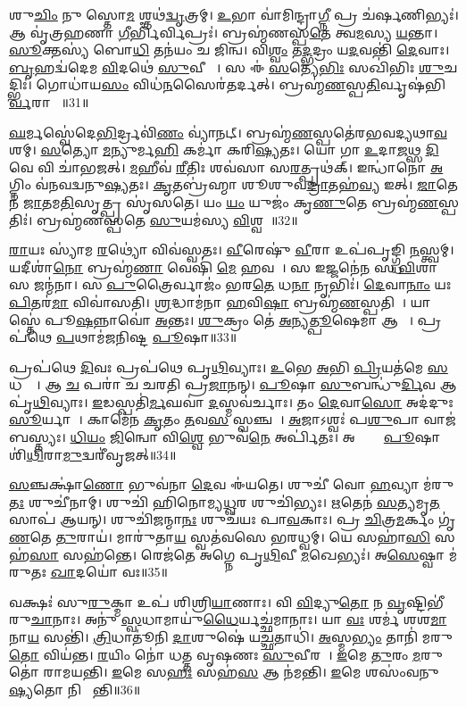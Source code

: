 𑌶𑍁\ul{𑌚𑌿𑌂} 𑌨𑍁 𑌸𑍍𑌤𑍋\ul{𑌮}\ul{} 𑌶𑍍𑌞𑌥॑\ul{𑌦𑍍𑌵𑍃}𑌤𑍍𑌰𑌮𑍍।
\ul{𑌉}𑌭𑌾 𑌵𑌾॑𑌮𑌿𑌨𑍍𑌦𑍍𑌰𑌾\ul{𑌗𑍍𑌨𑍀} 𑌪𑍍𑌰 𑌚॑𑌰𑍍\mbox{}\ul{𑌷}𑌣𑌿𑌭𑍍𑌯𑌃॑।
𑌆 𑌵𑍃॑𑌤𑍍𑌰𑌹𑌣𑌾 \ul{𑌗𑍀}𑌰𑍍𑌭𑌿𑌰𑍍𑌵𑌿𑌪𑍍𑌰𑌃॑।
𑌬𑍍𑌰𑌹𑍍𑌮॑𑌣𑌸𑍍𑌪\ul{𑌤𑍇} 𑌤𑍍𑌵\ul{𑌮}𑌸𑍍𑌯 \ul{𑌯}𑌨𑍍𑌤𑌾।
\ul{𑌸𑍂}𑌕𑍍𑌤𑌸𑍍𑌯॑ 𑌬𑍋\ul{𑌧𑌿} 𑌤𑌨॑𑌯𑌂 𑌚 𑌜𑌿𑌨𑍍𑌵।
𑌵𑌿\ul{𑌶𑍍𑌵𑌂} 𑌤\ul{𑌦𑍍𑌭}𑌦𑍍𑌰𑌂 𑌯\ul{𑌦}𑌵𑌨𑍍𑌤𑌿॑ \ul{𑌦𑍇}𑌵𑌾𑌃।
\ul{𑌬𑍃}𑌹𑌦𑍍𑌵॑𑌦𑍇𑌮 \ul{𑌵𑌿}𑌦𑌥𑍇॑ \ul{𑌸𑍁}𑌵𑍀𑌰𑌾𑌃᳚।
𑌸 𑌈॑ \ul{𑌸}𑌤𑍍𑌯𑍇\ul{𑌭𑌿𑌃} 𑌸𑌖𑌿॑𑌭𑌿𑌃 \ul{𑌶𑍁}𑌚𑌦𑍍𑌭𑌿𑌃॑।
𑌗𑍋𑌧𑌾॑𑌯\ul{𑌸𑌂} 𑌵𑌿𑌧॑\ul{𑌨}𑌸𑍈𑌰॑𑌤𑌰𑍍𑌦𑌤𑍍।
𑌬𑍍𑌰𑌹𑍍𑌮॑\ul{𑌣}𑌸𑍍𑌪\ul{𑌤𑌿}𑌰𑍍𑌵𑍃𑌷॑𑌭𑌿\ul{𑌰𑍍𑌵}𑌰𑌾𑌹𑍈𑌃᳚॥31॥

\ul{𑌘}𑌰𑍍𑌮𑌸𑍍𑌵𑍇॑𑌦𑍇\ul{𑌭𑌿}𑌰𑍍𑌦𑍍𑌰𑌵𑌿॑\ul{𑌣𑌂} 𑌵𑍍𑌯𑌾॑𑌨𑌟𑍍।
𑌬𑍍𑌰𑌹𑍍𑌮॑\ul{𑌣}𑌸𑍍𑌪𑌤𑍇॑𑌰𑌭𑌵𑌦𑍍𑌯𑌥𑌾\ul{𑌵}𑌶𑌮𑍍।
\ul{𑌸}𑌤𑍍𑌯𑍋 \ul{𑌮}𑌨𑍍𑌯𑍁𑌰𑍍𑌮\ul{𑌹𑌿} 𑌕𑌰𑍍𑌮𑌾॑ 𑌕𑌰𑌿\ul{𑌷𑍍𑌯}𑌤𑌃।
𑌯𑍋 𑌗𑌾 \ul{𑌉}𑌦𑌾\ul{𑌜}𑌥𑍍𑌸 \ul{𑌦𑌿}𑌵𑍇 𑌵𑌿 𑌚𑌾॑𑌭𑌜𑌤𑍍।
\ul{𑌮}𑌹𑍀𑌵॑ \ul{𑌰𑍀}𑌤𑌿𑌃 𑌶𑌵॑𑌸𑌾 𑌸\ul{𑌰}𑌤𑍍𑌪𑍃𑌥॑𑌕𑍍।
𑌇𑌨𑍍𑌧𑌾॑𑌨𑍋 \ul{𑌅}𑌗𑍍𑌨𑌿𑌂 𑌵॑𑌨𑌵𑌦𑍍𑌵𑌨𑍁\ul{𑌷𑍍𑌯}𑌤𑌃।
\ul{𑌕𑍃}𑌤𑌬𑍍𑌰॑𑌹𑍍𑌮𑌾 𑌶𑍂𑌶𑍁𑌵\ul{𑌦𑍍𑌰𑌾}𑌤𑌹॑\ul{𑌵𑍍𑌯} 𑌇𑌤𑍍।
\ul{𑌜𑌾}𑌤𑍇𑌨॑ \ul{𑌜𑌾}𑌤𑌮\ul{𑌤𑌿}𑌸𑍃𑌤𑍍𑌪𑍍𑌰 𑌸𑍃॑𑌸𑌤𑍇।
𑌯𑌂 \ul{𑌯𑌂} 𑌯𑍁𑌜𑌂॑ 𑌕𑍃\ul{𑌣𑍁}𑌤𑍇 𑌬𑍍𑌰𑌹𑍍𑌮॑\ul{𑌣}𑌸𑍍𑌪𑌤𑌿𑌃॑।
𑌬𑍍𑌰𑌹𑍍𑌮॑𑌣𑌸𑍍𑌪𑌤𑍇 \ul{𑌸𑍁}𑌯𑌮॑𑌸𑍍𑌯 \ul{𑌵𑌿}𑌶𑍍𑌵𑌹𑌾᳚॥32॥

\ul{𑌰𑌾}𑌯𑌃 𑌸𑍍𑌯𑌾॑𑌮 \ul{𑌰}𑌥𑍍𑌯𑍋॑ 𑌵𑌿𑌵॑𑌸𑍍𑌵𑌤𑌃।
\ul{𑌵𑍀}𑌰𑍇𑌷𑍁॑ \ul{𑌵𑍀}𑌰𑌾 𑌉𑌪॑𑌪𑍃𑌙𑍍𑌗𑍍𑌧𑌿 \ul{𑌨}𑌸𑍍𑌤𑍍𑌵𑌮𑍍।
𑌯𑌦𑍀𑌶𑌾॑\ul{𑌨𑍋} 𑌬𑍍𑌰𑌹𑍍𑌮॑\ul{𑌣𑌾} 𑌵𑍇𑌷𑌿॑ \ul{𑌮𑍇} 𑌹𑌵𑌮𑍍᳚।
𑌸 𑌇𑌜𑍍𑌜𑌨𑍇॑\ul{𑌨} 𑌸 \ul{𑌵𑌿}𑌶𑌾 𑌸 𑌜𑌨𑍍𑌮॑𑌨𑌾।
𑌸 \ul{𑌪𑍁}𑌤𑍍𑌰𑍈𑌰𑍍𑌵𑌾𑌜𑌂॑ 𑌭𑌰\ul{𑌤𑍇} 𑌧\ul{𑌨𑌾} 𑌨𑍃𑌭𑌿𑌃॑।
\ul{𑌦𑍇}𑌵𑌾\ul{𑌨𑌾𑌂} 𑌯𑌃 \ul{𑌪𑌿}𑌤𑌰॑\ul{𑌮𑌾} 𑌵𑌿𑌵𑌾॑𑌸𑌤𑌿।
\ul{𑌶𑍍𑌰}𑌦𑍍𑌧𑌾𑌮॑𑌨𑌾 \ul{𑌹}𑌵𑌿\ul{𑌷𑌾} 𑌬𑍍𑌰𑌹𑍍𑌮॑\ul{𑌣}𑌸𑍍𑌪𑌤𑌿𑌮𑍍᳚।
𑌯𑌾𑌸𑍍𑌤𑍇॑ 𑌪𑍂\ul{𑌷}𑌨𑍍𑌨𑌾𑌵𑍋॑ \ul{𑌅}𑌨𑍍𑌤𑌃।
\ul{𑌶𑍁}𑌕𑍍𑌰𑌂 𑌤𑍇॑ \ul{𑌅}𑌨𑍍𑌯\ul{𑌤𑍍𑌪𑍂}𑌷𑍇𑌮𑌾 𑌆𑌶𑌾𑌃᳚।
𑌪𑍍𑌰𑌪॑𑌥𑍇 \ul{𑌪}𑌥𑌾𑌮॑𑌜𑌨𑌿𑌷𑍍𑌟 \ul{𑌪𑍂}𑌷𑌾॥33॥

𑌪𑍍𑌰𑌪॑𑌥𑍇 \ul{𑌦𑌿}𑌵𑌃 𑌪𑍍𑌰𑌪॑𑌥𑍇 𑌪𑍃\ul{𑌥𑌿}𑌵𑍍𑌯𑌾𑌃।
\ul{𑌉}𑌭𑍇 \ul{𑌅}𑌭𑌿 \ul{𑌪𑍍𑌰𑌿}𑌯𑌤॑𑌮𑍇 \ul{𑌸}𑌧𑌸𑍍𑌥𑍇᳚।
𑌆 \ul{𑌚} 𑌪𑌰𑌾॑ 𑌚 𑌚𑌰𑌤𑌿 𑌪𑍍𑌰\ul{𑌜𑌾}𑌨𑌨𑍍।
\ul{𑌪𑍂}𑌷𑌾 \ul{𑌸𑍁}𑌬𑌨𑍍𑌧𑍁॑\ul{𑌰𑍍𑌦𑌿}𑌵 𑌆 𑌪𑍃॑\ul{𑌥𑌿}𑌵𑍍𑌯𑌾𑌃।
\ul{𑌇}𑌡𑌸𑍍𑌪𑌤𑌿॑\ul{𑌰𑍍𑌮}𑌘𑌵𑌾॑ \ul{𑌦}𑌸𑍍𑌮𑌵॑𑌰𑍍𑌚𑌾𑌃।
𑌤𑌂 \ul{𑌦𑍇}𑌵𑌾\ul{𑌸𑍋} 𑌅𑌦॑𑌦𑍁𑌃 \ul{𑌸𑍂}𑌰𑍍𑌯𑌾𑌯𑍈᳚।
𑌕𑌾𑌮𑍇॑𑌨 \ul{𑌕𑍃}𑌤𑌂 \ul{𑌤}𑌵\ul{𑌸}\ul{} 𑌸𑍍𑌵𑌞𑍍𑌚𑌮𑍍᳚।
\ul{𑌅}𑌜𑌾𑌽𑌶𑍍𑌵𑌃॑ 𑌪\ul{𑌶𑍁}𑌪𑌾 𑌵𑌾𑌜॑𑌬𑌸𑍍𑌤𑍍𑌯𑌃।
\ul{𑌧𑌿}\ul{𑌯𑌂} \ul{𑌜𑌿}𑌨𑍍𑌵𑍋 𑌵𑌿\ul{𑌶𑍍𑌵𑍇} 𑌭𑍁𑌵॑\ul{𑌨𑍇} 𑌅𑌰𑍍𑌪𑌿॑𑌤𑌃।
𑌅𑌷𑍍𑌟𑍍𑌰𑌾𑌂᳚ \ul{𑌪𑍂}𑌷𑌾 𑌶𑌿॑\ul{𑌥𑌿}𑌰𑌾\ul{𑌮𑍁}𑌦𑍍𑌵𑌰𑍀॑𑌵𑍃𑌜𑌤𑍍॥34॥

\ul{𑌸}𑌞𑍍𑌚𑌕𑍍𑌷𑌾॑\ul{𑌣𑍋} 𑌭𑍁𑌵॑𑌨𑌾 \ul{𑌦𑍇}𑌵 𑌈॑𑌯𑌤𑍇।
𑌶𑍁𑌚𑍀॑ 𑌵𑍋 \ul{𑌹}𑌵𑍍𑌯𑌾 𑌮॑𑌰𑍁\ul{𑌤𑌃} 𑌶𑍁𑌚𑍀॑𑌨𑌾𑌮𑍍।
𑌶𑍁𑌚𑌿॑ 𑌹𑌿𑌨𑍋𑌮𑍍𑌯\ul{𑌧𑍍𑌵}𑌰 𑌶𑍁𑌚𑌿॑𑌭𑍍𑌯𑌃।
\ul{𑌋}𑌤𑍇𑌨॑ \ul{𑌸}𑌤𑍍𑌯𑌮𑍃\ul{𑌤}𑌸𑌾𑌪॑ 𑌆𑌯𑌨𑍍।
𑌶𑍁𑌚𑌿॑𑌜𑌨𑍍𑌮𑌾\ul{𑌨𑌃} 𑌶𑍁𑌚॑𑌯𑌃 𑌪𑌾\ul{𑌵}𑌕𑌾𑌃।
𑌪𑍍𑌰 \ul{𑌚𑌿}𑌤𑍍𑌰\ul{𑌮}𑌰𑍍𑌕𑌂 𑌗𑍃॑\ul{𑌣}𑌤𑍇 \ul{𑌤𑍁}𑌰𑌾𑌯॑।
𑌮𑌾𑌰𑍁॑𑌤𑌾\ul{𑌯} 𑌸𑍍𑌵𑌤॑𑌵𑌸𑍇 𑌭𑌰𑌧𑍍𑌵𑌮𑍍।
𑌯𑍇 𑌸𑌹𑌾॑\ul{𑌸𑌿} 𑌸𑌹॑\ul{𑌸𑌾} 𑌸𑌹॑𑌨𑍍𑌤𑍇।
𑌰𑍇𑌜॑𑌤𑍇 𑌅𑌗𑍍𑌨𑍇 𑌪𑍃\ul{𑌥𑌿}𑌵𑍀 \ul{𑌮}𑌖𑍇𑌭𑍍𑌯𑌃॑।
𑌅\ul{𑌸𑍇}𑌷𑍍𑌵𑌾 𑌮॑𑌰𑍁𑌤𑌃 \ul{𑌖𑌾}𑌦𑌯𑍋॑ 𑌵𑌃॥35॥

𑌵𑌕𑍍𑌷𑌃॑ 𑌸𑍁\ul{𑌰𑍁}𑌕𑍍𑌮𑌾 𑌉𑌪॑ 𑌶𑌿𑌶𑍍𑌰𑌿\ul{𑌯𑌾}𑌣𑌾𑌃।
𑌵𑌿 \ul{𑌵𑌿}𑌦𑍍𑌯𑍁\ul{𑌤𑍋} 𑌨 \ul{𑌵𑍃}𑌷𑍍𑌟𑌿𑌭𑍀॑ 𑌰𑍁\ul{𑌚𑌾}𑌨𑌾𑌃।
𑌅𑌨𑍁॑ \ul{𑌸𑍍𑌵}𑌧𑌾𑌮𑌾𑌯𑍁॑\ul{𑌧𑍈}𑌰𑍍𑌯𑌚𑍍𑌛॑𑌮𑌾𑌨𑌾𑌃।
𑌯𑌾 \ul{𑌵𑌃} 𑌶𑌰𑍍𑌮॑ 𑌶𑌶\ul{𑌮𑌾}𑌨𑌾\ul{𑌯} 𑌸𑌨𑍍𑌤𑌿॑।
\ul{𑌤𑍍𑌰𑌿}𑌧𑌾𑌤𑍂॑𑌨𑌿 \ul{𑌦𑌾}𑌶𑍁𑌷𑍇॑ 𑌯\ul{𑌚𑍍𑌛}𑌤𑌾𑌧𑌿॑।
\ul{𑌅}𑌸𑍍𑌮\ul{𑌭𑍍𑌯𑌂} 𑌤𑌾𑌨𑌿॑ 𑌮𑌰𑍁\ul{𑌤𑍋} 𑌵𑌿𑌯॑𑌨𑍍𑌤।
\ul{𑌰}𑌯𑌿𑌂 𑌨𑍋॑ 𑌧𑌤𑍍𑌤 𑌵𑍃𑌷𑌣𑌃 \ul{𑌸𑍁}𑌵𑍀𑌰𑌮𑍍᳚।
\ul{𑌇}𑌮𑍇 \ul{𑌤𑍁}𑌰𑌂 \ul{𑌮}𑌰𑍁𑌤𑍋॑ 𑌰𑌾𑌮𑌯𑌨𑍍𑌤𑌿।
\ul{𑌇}𑌮𑍇 𑌸\ul{𑌹𑌃} 𑌸𑌹॑\ul{𑌸} 𑌆 𑌨॑𑌮𑌨𑍍𑌤𑌿।
\ul{𑌇}𑌮𑍇 𑌶𑌸𑌂॑𑌵𑌨𑍁\ul{𑌷𑍍𑌯}𑌤𑍋 𑌨𑌿 𑌪𑌾᳚𑌨𑍍𑌤𑌿॥36॥

